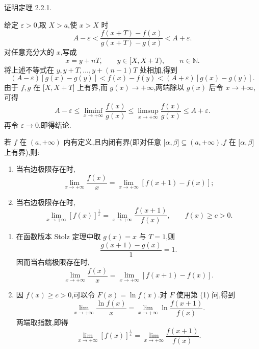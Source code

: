 \begin{example}
    证明定理 2.2.1.
\end{example}
\exampleblank

\begin{solution}
    给定 $\varepsilon>0$,取 $X>a$,使 $x>X$ 时
    \[
        A-\varepsilon<
        \dfrac{f(x+T)-f(x)}{g(x+T)-g(x)}
        <A+\varepsilon.
    \]
    对任意充分大的 $x$,写成
    \[
        x=y+nT,
        \qquad
        y\in\lbrack X,X+T),
        \qquad
        n\in\mathbb{N}.
    \]
    将上述不等式在 $y,y+T,\ldots,y+(n-1)T$ 处相加,得到
    \[
        (A-\varepsilon)[g(x)-g(y)]
        <f(x)-f(y)
        <(A+\varepsilon)[g(x)-g(y)].
    \]
    由于 $f,g$ 在 $\lbrack X,X+T\rbrack$ 上有界,而 $g(x)\to+\infty$,两端除以 $g(x)$ 后令 $x\to+\infty$,可得
    \[
        A-\varepsilon
        \leq\liminf\limits_{x\to+\infty}\dfrac{f(x)}{g(x)}
        \leq\limsup\limits_{x\to+\infty}\dfrac{f(x)}{g(x)}
        \leq A+\varepsilon.
    \]
    再令 $\varepsilon\to0$,即得结论.
\end{solution}

\begin{example}[Cauchy 定理]
    若 $f$ 在 $(a,+\infty)$ 内有定义,且内闭有界(即对任意 $\lbrack \alpha,\beta\rbrack\subseteq(a,+\infty)$,$f$ 在 $\lbrack \alpha,\beta\rbrack$ 上有界),则:
    \begin{enumerate}
        \item 当右边极限存在时,
              \[
                  \lim\limits_{x\to+\infty}\dfrac{f(x)}{x}
                  =\lim\limits_{x\to+\infty}[f(x+1)-f(x)];
              \]
        \item 当右边极限存在时,
              \[
                  \lim\limits_{x\to+\infty}[f(x)]^{\frac{1}{x}}
                  =\lim\limits_{x\to+\infty}\dfrac{f(x+1)}{f(x)},
                  \qquad f(x)\geq c>0.
              \]
    \end{enumerate}
\end{example}
\exampleblank

\begin{solution}
    \begin{enumerate}
        \item 在函数版本 Stolz 定理中取 $g(x)=x$ 与 $T=1$,则
              \[
                  \dfrac{g(x+1)-g(x)}{1}=1.
              \]
              因而当右端极限存在时,
              \[
                  \lim\limits_{x\to+\infty}\dfrac{f(x)}{x}
                  =\lim\limits_{x\to+\infty}[f(x+1)-f(x)].
              \]
        \item 因 $f(x)\geq c>0$,可以令 $F(x)=\ln f(x)$.对 $F$ 使用第 (1) 问,得到
              \[
                  \lim\limits_{x\to+\infty}\dfrac{\ln f(x)}{x}
                  =\lim\limits_{x\to+\infty}
                  \ln\dfrac{f(x+1)}{f(x)}.
              \]
              两端取指数,即得
              \[
                  \lim\limits_{x\to+\infty}[f(x)]^{\frac{1}{x}}
                  =\lim\limits_{x\to+\infty}\dfrac{f(x+1)}{f(x)}.
              \]
    \end{enumerate}
\end{solution}

